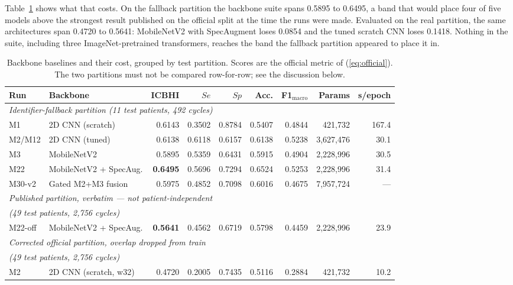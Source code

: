 \documentclass[journal,onecolumn]{IEEEtran}
\newcommand{\best}[1]{\textbf{#1}}
\begin{document}
Table~\ref{tab:baselines} shows what that costs. On the fallback partition the
backbone suite spans 0.5895 to 0.6495, a band that would place four of five models
above the strongest result published on the official split at the time the runs were
made. Evaluated on the real partition, the same architectures span 0.4720 to 0.5641:
MobileNetV2 with SpecAugment loses 0.0854 and the tuned scratch CNN loses 0.1418.
Nothing in the suite, including three ImageNet-pretrained transformers, reaches the band
the fallback partition appeared to place it in.

\begin{table}[!t]
\centering
\caption{Backbone baselines and their cost, grouped by test partition. Scores are the
official metric of (\ref{eq:official}). The two partitions must not be compared
row-for-row; see the discussion below.}
\label{tab:baselines}
\begin{tabular}{llrrrrrrr}
\toprule
Run & Backbone & ICBHI & $Se$ & $Sp$ & Acc. & F1$_{\text{macro}}$ & Params & s/epoch \\
\midrule
\multicolumn{9}{l}{\emph{Identifier-fallback partition (11 test patients, 492 cycles)}}\\
M1     & 2D CNN (scratch)        & 0.6143 & 0.3502 & 0.8784 & 0.5407 & 0.4844 & 421{,}732   & 167.4 \\
M2/M12 & 2D CNN (tuned)          & 0.6138 & 0.6118 & 0.6157 & 0.6138 & 0.5238 & 3{,}627{,}476 & 30.1 \\
M3     & MobileNetV2             & 0.5895 & 0.5359 & 0.6431 & 0.5915 & 0.4904 & 2{,}228{,}996 & 30.5 \\
M22    & MobileNetV2 + SpecAug.  & \best{0.6495} & 0.5696 & 0.7294 & 0.6524 & 0.5253 & 2{,}228{,}996 & 31.4 \\
M30-v2 & Gated M2+M3 fusion      & 0.5975 & 0.4852 & 0.7098 & 0.6016 & 0.4675 & 7{,}957{,}724 & --- \\
\midrule
\multicolumn{9}{l}{\emph{Published partition, verbatim --- not patient-independent}}\\
\multicolumn{9}{l}{\emph{(49 test patients, 2{,}756 cycles)}}\\
M22-off & MobileNetV2 + SpecAug. & \best{0.5641} & 0.4562 & 0.6719 & 0.5798 & 0.4459 & 2{,}228{,}996 & 23.9 \\
\midrule
\multicolumn{9}{l}{\emph{Corrected official partition, overlap dropped from train}}\\
\multicolumn{9}{l}{\emph{(49 test patients, 2{,}756 cycles)}}\\
M2     & 2D CNN (scratch, w32)   & 0.4720 & 0.2005 & 0.7435 & 0.5116 & 0.2884 & 421{,}732     & 10.2 \\

\end{tabular}
\end{table}
\end{document}
